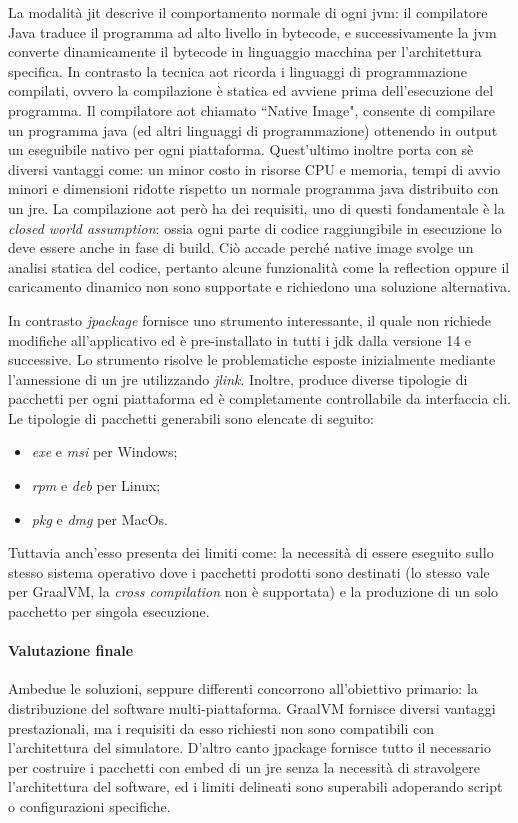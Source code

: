 La modalità \ac{jit} descrive il comportamento normale di ogni \ac{jvm}: il compilatore Java traduce il programma ad alto livello in bytecode, e successivamente la \ac{jvm} converte dinamicamente il bytecode in linguaggio macchina per l'architettura specifica. In contrasto la tecnica \ac{aot} ricorda i linguaggi di programmazione compilati, ovvero la compilazione è statica ed avviene prima dell'esecuzione del programma. Il compilatore \ac{aot} chiamato ``Native Image", consente di compilare un programma java (ed altri linguaggi di programmazione) ottenendo in output un eseguibile nativo per ogni piattaforma. Quest'ultimo inoltre porta con sè diversi vantaggi come: un minor costo in risorse CPU e memoria, tempi di avvio minori e dimensioni ridotte rispetto un normale programma java distribuito con un \ac{jre}. La compilazione \ac{aot} però ha dei requisiti, uno di questi fondamentale è la \textit{closed world assumption}: ossia ogni parte di codice raggiungibile in esecuzione lo deve essere anche in fase di build. Ciò accade perché native image svolge un analisi statica del codice, pertanto alcune funzionalità come la reflection oppure il caricamento dinamico non sono supportate e richiedono una soluzione alternativa.

In contrasto \textit{jpackage} fornisce uno strumento interessante, il quale non richiede modifiche all'applicativo ed è pre-installato in tutti i \ac{jdk} dalla versione 14 e successive. Lo strumento risolve le problematiche esposte inizialmente mediante l'annessione di un \ac{jre} utilizzando \textit{jlink}. Inoltre, produce diverse tipologie di pacchetti per ogni piattaforma ed è completamente controllabile da interfaccia \ac{cli}. Le tipologie di pacchetti generabili sono elencate di seguito:
\begin{itemize}
	\item \textit{exe} e \textit{msi} per Windows;
	\item \textit{rpm} e \textit{deb} per Linux;
	\item \textit{pkg} e \textit{dmg} per MacOs.
\end{itemize}
Tuttavia anch'esso presenta dei limiti come: la necessità di essere eseguito sullo stesso sistema operativo dove i pacchetti prodotti sono destinati (lo stesso vale per GraalVM, la \textit{cross compilation} non è supportata) e la produzione di un solo pacchetto per singola esecuzione.

\paragraph{Valutazione finale} Ambedue le soluzioni, seppure differenti concorrono all'obiettivo primario: la distribuzione del software multi-piattaforma. GraalVM fornisce diversi vantaggi prestazionali, ma i requisiti da esso richiesti non sono compatibili con l'architettura del simulatore. D'altro canto jpackage fornisce tutto il necessario per costruire i pacchetti con embed di un \ac{jre} senza la necessità di stravolgere l'architettura del software, ed i limiti delineati sono superabili adoperando script o configurazioni specifiche.

